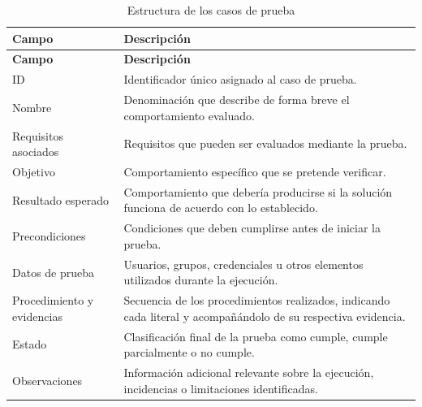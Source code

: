 \begingroup
\fontsize{8.5pt}{9.5pt}\selectfont
\renewcommand{\arraystretch}{1.3}
\setlength{\tabcolsep}{4pt}

\begin{longtable}{|
	>{\raggedright\arraybackslash}p{4.0cm}|
	>{\raggedright\arraybackslash}p{9.5cm}|}

	\caption{Estructura de los casos de prueba}
	\label{tab:estructura-casos-prueba}
	\\
	\hline
	\tableheader
	\textbf{Campo}             &
	\textbf{Descripción}
	\\
	\hline
	\endfirsthead

	\hline
	\tableheader
	\textbf{Campo}             &
	\textbf{Descripción}
	\\
	\hline
	\endhead

	ID                         & Identificador único asignado al caso de prueba.                                                                \\ \hline
	Nombre                     & Denominación que describe de forma breve el comportamiento evaluado.                                           \\ \hline
	Requisitos asociados       & Requisitos que pueden ser evaluados mediante la prueba.                                                        \\ \hline
	Objetivo                   & Comportamiento específico que se pretende verificar.                                                           \\ \hline
	Resultado esperado         & Comportamiento que debería producirse si la solución funciona de acuerdo con lo establecido.                   \\ \hline
	Precondiciones             & Condiciones que deben cumplirse antes de iniciar la prueba.                                                    \\ \hline
	Datos de prueba            & Usuarios, grupos, credenciales u otros elementos utilizados durante la ejecución.                              \\ \hline
	Procedimiento y evidencias & Secuencia de los procedimientos realizados, indicando cada literal y acompañándolo de su respectiva evidencia. \\ \hline
	Estado                     & Clasificación final de la prueba como cumple, cumple parcialmente o no cumple.                                 \\ \hline
	Observaciones              & Información adicional relevante sobre la ejecución, incidencias o limitaciones identificadas.                  \\ \hline
\end{longtable}
\endgroup
\normalsize
